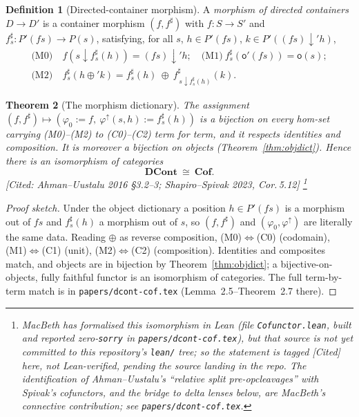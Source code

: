 \documentclass[11pt,a4paper]{book}
\newcommand{\Cof}{\mathbf{Cof}}
\newcommand{\DCont}{\mathbf{DCont}}
\theoremstyle{plain}
\newtheorem{Theorem}{Theorem}[chapter]
\theoremstyle{definition}
\newtheorem{Definition}[Theorem]{Definition}
\theoremstyle{remark}
\newcommand{\prov}[1]{\hfill\textsf{\footnotesize[#1]}}
\begin{document}
\begin{Definition}[Directed-container morphism]\label{def:dcm}
A \emph{morphism of directed containers} $D\to D'$ is a container morphism
$(f,f^\sharp)$ with $f\colon S\to S'$ and $f^\sharp_s\colon P'(fs)\to P(s)$,
satisfying, for all $s$, $h\in P'(fs)$, $k\in P'((fs)\downarrow' h)$,
\begin{align*}
  \text{(M0)}\ & f(s\downarrow f^\sharp_s(h))=(fs)\downarrow' h;\quad
  \text{(M1)}\ f^\sharp_s(\mathsf o'(fs))=\mathsf o(s);\\
  \text{(M2)}\ & f^\sharp_s(h\oplus' k)=
        f^\sharp_s(h)\ \oplus\ f^\sharp_{\,s\downarrow f^\sharp_s(h)}(k).
\end{align*}
\end{Definition}

\begin{Theorem}[The morphism dictionary]\label{thm:dcontcof}
The assignment $(f,f^\sharp)\mapsto(\varphi_0:=f,\ \varphi^\uparrow(s,h):=f^\sharp_s(h))$
is a bijection on every hom-set carrying (M0)--(M2) to (C0)--(C2) term for term,
and it respects identities and composition. It is moreover a bijection on objects
(Theorem~\ref{thm:objdict}). Hence there is an isomorphism of categories
\[
  \DCont\ \cong\ \Cof .
\]
\prov{Cited: Ahman--Uustalu 2016 \S3.2--3; Shapiro--Spivak 2023, Cor.\,5.12}%
\footnote{MacBeth has formalised this isomorphism in Lean (file
\texttt{Cofunctor.lean}, built and reported zero-\texttt{sorry} in
\texttt{papers/dcont-cof.tex}), but that source is \emph{not yet committed} to
this repository's \texttt{lean/} tree; so the statement is tagged \textsf{[Cited]}
here, not \textsf{Lean-verified}, pending the source landing in the repo. The
\emph{identification} of Ahman--Uustalu's ``relative split pre-opcleavages'' with
Spivak's cofunctors, and the bridge to delta lenses below, are MacBeth's
connective contribution; see \texttt{papers/dcont-cof.tex}.}
\end{Theorem}

\begin{proof}[Proof sketch]
Under the object dictionary a position $h\in P'(fs)$ is a morphism out of $fs$ and
$f^\sharp_s(h)$ a morphism out of $s$, so $(f,f^\sharp)$ and
$(\varphi_0,\varphi^\uparrow)$ are literally the same data. Reading $\oplus$ as
reverse composition, (M0)$\Leftrightarrow$(C0) (codomain), (M1)$\Leftrightarrow$(C1)
(unit), (M2)$\Leftrightarrow$(C2) (composition). Identities and composites match,
and objects are in bijection by Theorem~\ref{thm:objdict}; a bijective-on-objects,
fully faithful functor is an isomorphism of categories. The full term-by-term
match is in \texttt{papers/dcont-cof.tex} (Lemma~2.5--Theorem~2.7 there).
\end{proof}
\end{document}
